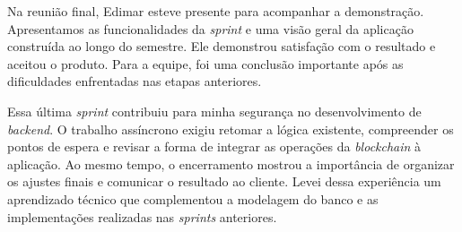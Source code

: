 Na reunião final, Edimar esteve presente para acompanhar a demonstração. Apresentamos as funcionalidades da \textit{sprint} e uma visão geral da aplicação construída ao longo do semestre. Ele demonstrou satisfação com o resultado e aceitou o produto. Para a equipe, foi uma conclusão importante após as dificuldades enfrentadas nas etapas anteriores.

Essa última \textit{sprint} contribuiu para minha segurança no desenvolvimento de \textit{backend}. O trabalho assíncrono exigiu retomar a lógica existente, compreender os pontos de espera e revisar a forma de integrar as operações da \textit{blockchain} à aplicação. Ao mesmo tempo, o encerramento mostrou a importância de organizar os ajustes finais e comunicar o resultado ao cliente. Levei dessa experiência um aprendizado técnico que complementou a modelagem do banco e as implementações realizadas nas \textit{sprints} anteriores.
